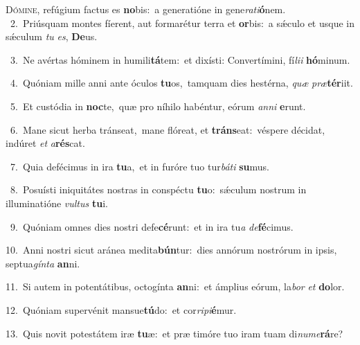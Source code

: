\lettrine{\initial\textcolor{\initialcolor}{D}}{ómine,} refúgium factus es \textbf{no}\-bis:~\star a generatióne in gene\-\textit{ra}\-\textit{ti}\textbf{ó}nem.\\
{\numbfont\textcolor{\numbcolor}{~2.}}~Priúsquam montes fíerent, aut formarétur terra et \textbf{or}\-bis:~\star a sǽculo et usque in sǽculum \textit{tu} \textit{es}\-, \textbf{De}\-us.\par
{\numbfont\textcolor{\numbcolor}{~3.}}~Ne avértas hóminem in humili\-\textbf{tá}\-tem:~\star et dixísti: Convertímini, fí\-\textit{li}\-\textit{i} \textbf{hó}\-minum.\par
{\numbfont\textcolor{\numbcolor}{~4.}}~Quóniam mille anni ante óculos \textbf{tu}\-os,~\star tamquam dies hestérna, \textit{quæ} \textit{præ}\-\textbf{tér}iit.\par
{\numbfont\textcolor{\numbcolor}{~5.}}~Et custódia in \textbf{noc}\-te,~\star quæ pro níhilo habéntur, eórum \textit{an}\-\textit{ni} \textbf{e}\-runt.\par
{\numbfont\textcolor{\numbcolor}{~6.}}~Mane sicut herba tránseat,~\dagger mane flóreat, et \textbf{tráns}\-eat:~\star véspere décidat, indúret \textit{et} \textit{a}\-\textbf{rés}cat.\par
{\numbfont\textcolor{\numbcolor}{~7.}}~Quia defécimus in ira \textbf{tu}\-a,~\star et in furóre tuo tur\-\textit{bá}\-\textit{ti} \textbf{su}\-mus.\par
{\numbfont\textcolor{\numbcolor}{~8.}}~Posuísti iniquitátes nostras in conspéctu \textbf{tu}\-o:~\star sǽculum nostrum in illuminatióne \textit{vul}\-\textit{tus} \textbf{tu}\-i.\par
{\numbfont\textcolor{\numbcolor}{~9.}}~Quóniam omnes dies nostri defe\-\textbf{cé}\-runt:~\star et in ira tu\textit{a} \textit{de}\-\textbf{fé}cimus.\par
{\numbfont\textcolor{\numbcolor}{10.}}~Anni nostri sicut aránea medita\-\textbf{bún}\-tur:~\star dies annórum nostrórum in ipsis, septua\-\textit{gín}\-\textit{ta} \textbf{an}\-ni.\par
{\numbfont\textcolor{\numbcolor}{11.}}~Si autem in potentátibus, octogínta \textbf{an}\-ni:~\star et ámplius eórum, la\textit{bor} \textit{et} \textbf{do}\-lor.\par
{\numbfont\textcolor{\numbcolor}{12.}}~Quóniam supervénit mansue\-\textbf{tú}\-do:~\star et cor\-\textit{ri}\-\textit{pi}\textbf{é}mur.\par
{\numbfont\textcolor{\numbcolor}{13.}}~Quis novit potestátem iræ \textbf{tu}\-æ:~\star et præ timóre tuo iram tuam di\-\textit{nu}\-\textit{me}\textbf{rá}re?\par
